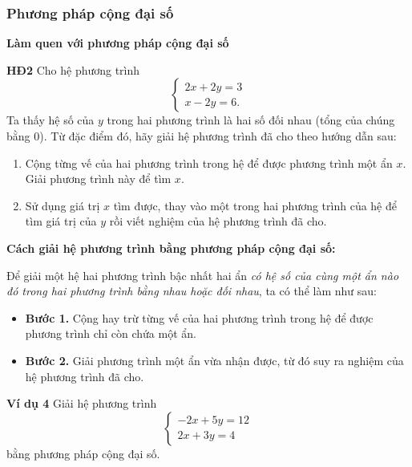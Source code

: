 \begin{lesson}
    \answerline
    \answerline
    \answerline

    \subsubsection{Phương pháp cộng đại số}

    \textbf{Làm quen với phương pháp cộng đại số}

    \textbf{HĐ2} Cho hệ phương trình
    \[
        \begin{cases}
            2x+2y=3\\
            x-2y=6.
        \end{cases}
    \]
    Ta thấy hệ số của $y$ trong hai phương trình là hai số đối nhau (tổng của chúng bằng 0). Từ đặc điểm đó, hãy giải hệ phương trình đã cho theo hướng dẫn sau:
    \begin{enumerate}
        \item Cộng từng vế của hai phương trình trong hệ để được phương trình một ẩn $x$. Giải phương trình này để tìm $x$.
        \item Sử dụng giá trị $x$ tìm được, thay vào một trong hai phương trình của hệ để tìm giá trị của $y$ rồi viết nghiệm của hệ phương trình đã cho.
    \end{enumerate}

    \answerline
    \answerline
    \answerline

    \begin{keyconcept}
        \textbf{Cách giải hệ phương trình bằng phương pháp cộng đại số:}

        Để giải một hệ hai phương trình bậc nhất hai ẩn \textit{có hệ số của cùng một ẩn nào đó trong hai phương trình bằng nhau hoặc đối nhau}, ta có thể làm như sau:
        \begin{itemize}
            \item \textbf{Bước 1.} Cộng hay trừ từng vế của hai phương trình trong hệ để được phương trình chỉ còn chứa một ẩn.
            \item \textbf{Bước 2.} Giải phương trình một ẩn vừa nhận được, từ đó suy ra nghiệm của hệ phương trình đã cho.
        \end{itemize}
    \end{keyconcept}

    \textbf{Ví dụ 4} Giải hệ phương trình
    \[
        \begin{cases}
            -2x+5y=12\\
            2x+3y=4
        \end{cases}
    \]
    bằng phương pháp cộng đại số.


\end{lesson}
